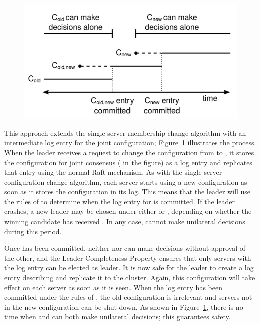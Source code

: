 \begin{figure}
\centering
\includegraphics[scale=.50]{membership/reconfigurationconf}
\label{fig:membership:reconfiguration}
\end{figure}

This approach extends the single-server membership change algorithm with an
intermediate log entry for the joint configuration;
Figure~\ref{fig:membership:reconfiguration} illustrates the
process. When the leader receives a request to
change the configuration from \cold{} to \cnew{}, it stores the
configuration for joint consensus (\cboth{} in the figure) as a log
entry and replicates that entry using the normal Raft mechanism. As with
the single-server configuration change algorithm, each server starts
using a new configuration as soon as it stores the configuration in its
log. This means that
the leader will use the rules of \cboth{} to determine when the log
entry for \cboth{} is committed. If the leader crashes, a new
leader may be chosen under either \cold{} or \cboth{}, depending
on whether the winning candidate has received \cboth{}.  In any
case, \cnew{} cannot make unilateral decisions during this period.

Once \cboth{} has been committed, neither \cold{} nor \cnew{}
can make decisions without approval of the other, and
the Leader Completeness Property ensures that only servers with the
\cboth{} log entry can be elected as leader.
It is now safe for the
leader to create a log entry describing \cnew{} and replicate it
to the cluster. Again, this configuration will take effect on
each server as soon as it is seen. When the \cnew{} log entry
has been committed under the rules of \cnew{}, the old configuration
is irrelevant and servers not in the
new configuration can be shut down. As shown in
Figure~\ref{fig:membership:reconfiguration},
there is no time when \cold{} and \cnew{} can both make
unilateral decisions; this guarantees safety.


